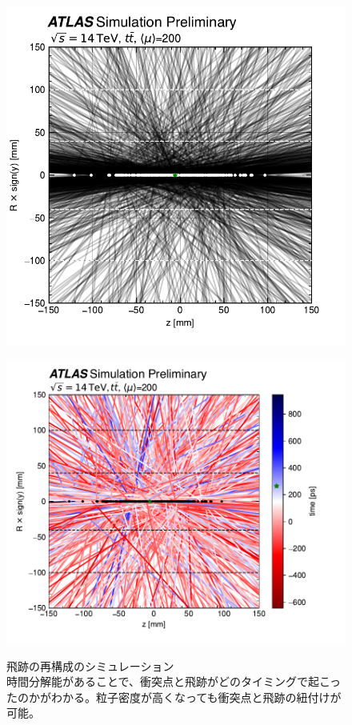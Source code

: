 \begin{figure}[h]
    \begin{minipage}[b]{0.5\linewidth}
        \centering
        \includegraphics[scale=0.5]{fig/ch1/ATLAS_3Dtrack.pdf}
        \label{fg:ATLAS_3Dtrack}
    \end{minipage}
    \begin{minipage}[b]{0.5\linewidth}
        \centering
        \includegraphics[scale=0.5]{fig/ch1/ATLAS_4Dtrack.pdf}
        \label{fg:ATLAS_4Dtrack}
    \end{minipage}
    \caption[飛跡の再構成のシミュレーション\cite{ATL-PHYS-PUB-2023-023}]{飛跡の再構成のシミュレーション\cite{ATL-PHYS-PUB-2023-023}\\時間分解能があることで、衝突点と飛跡がどのタイミングで起こったのかがわかる。粒子密度が高くなっても衝突点と飛跡の紐付けが可能。}
    \label{fg:4Dtrack_ATLAS}
\end{figure}


